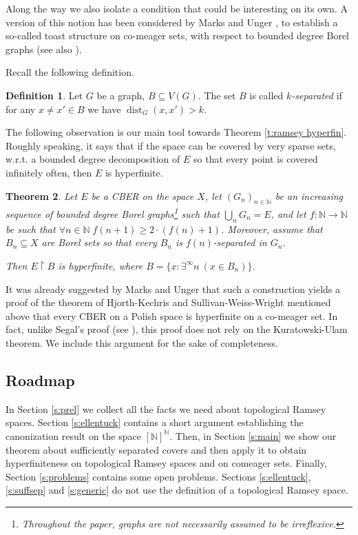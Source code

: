 \documentclass[11pt]{amsart}
\newcommand{\N}{\mathbb{N}}
\renewcommand{\restriction}[2]{#1 \upharpoonright #2}
\newtheorem{theorem}{Theorem}[section]
\theoremstyle{definition}
\newtheorem{definition}[theorem]{Definition}
\numberwithin{equation}{section}
\DeclareMathOperator{\dist}{dist}
\begin{document}
	Along the way we also isolate a condition that could be interesting on its own. A version of this notion has been considered by Marks and Unger \cite{marksungerbaire}, to establish a so-called toast structure on co-meager sets, with respect to bounded degree Borel graphs (see also \cite{gao2022forcing,conley2016bound,grebik_rozhon2021toasts_and_tails,brandt_chang_grebik_grunau_rozhon_vidnyaszky2021LCLs_on_trees_descriptive}).
	
	Recall the following definition. 
	\begin{definition}
		Let $G$ be a graph, $B \subseteq V(G)$. The set $B$ is called \emph{$k$-separated} if for any $x \neq x' \in B$ we have $\dist_{G}(x,x')>k$.
	\end{definition}
	
	The following observation is our main tool towards Theorem \ref{t:ramsey hyperfin}. Roughly speaking, it says that if the space can be covered by very sparse sets, w.r.t. a bounded degree decomposition of $E$ so that every point is covered infinitely often, then $E$ is hyperfinite. 
	
	\begin{theorem}
		\label{t:separation2}
		Let $E$ be a CBER on the space $X$, let $(G_n)_{n \in \N}$ be an increasing sequence of bounded degree Borel graphs\footnote{Throughout the paper, graphs are not necessarily assumed to be irreflexive.} such that $\bigcup_n G_n=E$, and let $f:\N\to\N$ be such that $\forall n\in\N\; f(n+1)\ge2\cdot(f(n)+1)$. Moreover, assume that $B_n \subseteq X$ are Borel sets so that every $B_n$ is $f(n)$-separated in $G_n$. 
		
		Then $\restriction{E}{B}$ is hyperfinite, where $B=\{x:\exists^\infty n \ (x \in B_n)\}$.
	\end{theorem}
	
	It was already suggested by Marks and Unger that such a construction yields a proof of the theorem of Hjorth-Kechris \cite{hjorth-kechris1996} and Sullivan-Weiss-Wright \cite{sullivan1986generic} mentioned above that every CBER on a Polish space is hyperfinite on a co-meager set. In fact, unlike Segal's proof (see \cite{kechris2004topics}), this proof does not rely on the Kuratowski-Ulam theorem. We include this argument for the sake of completeness.
	\subsection*{Roadmap} In Section \ref{s:prel} we collect all the facts we need about topological Ramsey spaces. Section \ref{s:ellentuck} contains a short argument establishing the canonization result on the space $[\N]^\N$. Then, in Section \ref{s:main} we show our theorem about sufficiently separated covers and then apply it to obtain hyperfiniteness on topological Ramsey spaces and on comeager sets. Finally, Section \ref{s:problems} contains some open problems. Sections \ref{s:ellentuck}, \ref{s:suffsep} and \ref{s:generic} do not use the definition of a topological Ramsey space. 
	
\end{document}

